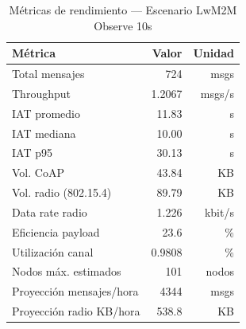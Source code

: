 
\begin{table}[htbp]
\centering
\caption{Métricas de rendimiento — Escenario LwM2M Observe 10s}
\label{tab:lwm2m-10s-deep}
\begin{tabular}{lrr}
\toprule
\textbf{Métrica} & \textbf{Valor} & \textbf{Unidad} \\
\midrule
Total mensajes & 724 & msgs \\
Throughput & 1.2067 & msgs/s \\
IAT promedio & 11.83 & s \\
IAT mediana & 10.00 & s \\
IAT p95 & 30.13 & s \\
Vol. CoAP & 43.84 & KB \\
Vol. radio (802.15.4) & 89.79 & KB \\
Data rate radio & 1.226 & kbit/s \\
Eficiencia payload & 23.6 & \% \\
Utilización canal & 0.9808 & \% \\
Nodos máx. estimados & 101 & nodos \\
Proyección mensajes/hora & 4344 & msgs \\
Proyección radio KB/hora & 538.8 & KB \\
\bottomrule
\end{tabular}
\end{table}

